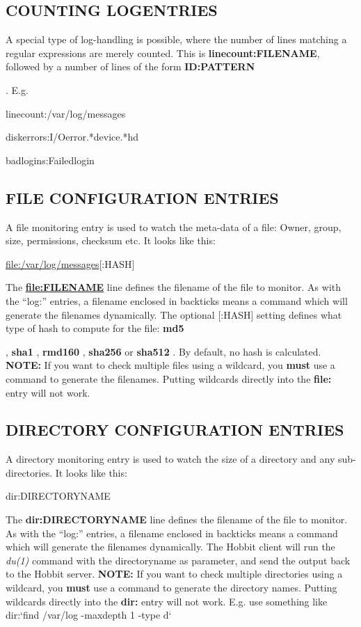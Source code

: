  
\subsection{COUNTING LOGENTRIES}
 A special type of log-handling is possible, where the number of lines
 matching a regular expressions are merely counted. This is
 \textbf{linecount:FILENAME}, followed by a number of lines of the
 form \textbf{ID:PATTERN}

. E.g. 

  
linecount:/var/log/messages  
 
diskerrors:I/Oerror.*device.*hd  
 
badlogins:Failedlogin 


 


 
\subsection{FILE CONFIGURATION ENTRIES}
 A file monitoring entry is used to watch the meta-data of a file:
 Owner, group, size, permissions, checksum etc. It looks like this: 


  
\url{file:/var/log/messages}[:HASH] 


  The \textbf{\url{file:FILENAME}}
 line defines the filename of the file to monitor. As with the
 ``log:'' entries, a filename enclosed in backticks means a command
 which will generate the filenames dynamically. The optional [:HASH]
 setting defines what type of hash to compute for the file:
 \textbf{md5}

, \textbf{sha1}
, \textbf{rmd160}
, \textbf{sha256}
 or \textbf{sha512}
. By default, no hash is calculated.  
\textbf{NOTE:}
 If you want to check multiple files using a wildcard, you \textbf{must}
 use a command to generate the filenames. Putting wildcards directly into the \textbf{file:}
 entry will not work. 


 
\subsection{DIRECTORY CONFIGURATION ENTRIES}
 A directory monitoring entry is used to watch the size of a directory and any sub-directories. It looks like this: 

  
dir:DIRECTORYNAME 


  The \textbf{dir:DIRECTORYNAME}
 line defines the filename of the file to monitor. As with the ``log:'' entries, a filename enclosed in backticks means a command which will generate the filenames dynamically. The Hobbit client will run the \emph{du(1)}
 command with the directoryname as parameter, and send the output back to the Hobbit server.  
\textbf{NOTE:}
 If you want to check multiple directories using a wildcard, you \textbf{must}
 use a command to generate the directory names. Putting wildcards directly into the \textbf{dir:}
 entry will not work. E.g. use something like  
dir:`find /var/log -maxdepth 1 -type d` 



